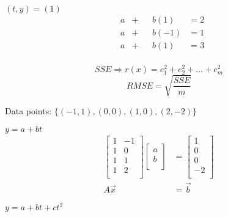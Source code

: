 \documentclass[
	date={October 9{,} 2024},
	month={10},
	day={9}
]{math486notes}
\begin{document}
\begin{example}
	$(t,y) = (1)$
	\begin{equation*}
	\begin{aligned}
		&a &+& &b(1) &= 2\\
		&a &+& &b(-1) &= 1\\
		&a &+& &b(1) &= 3\\
	\end{aligned}
	\end{equation*}
\end{example}

\begin{equation}
	SSE \Rightarrow r(x) = e_{1}^{2} + e_{2}^{2} + \dots + e_{m}^{2}
	\label{eq:sse}
\end{equation}
\begin{equation}
	RMSE = \sqrt{\frac{SSE}{m}}
	\label{eq:rmse}
\end{equation}

Data points: $\{ (-1, 1), (0, 0), (1, 0), (2, -2) \}$
\begin{example}
	$y = a + bt$
	\begin{equation*}
	\begin{aligned}
		\left[ \begin{array}{cc}
			1 & -1\\
			1 & 0\\
			1 & 1\\
			1 & 2\\
		\end{array} \right]\left[ \begin{array}{c}
			a\\
			b\\
		\end{array} \right] &= \left[ \begin{array}{c}
			1\\
			0\\
			0\\
			-2\\
		\end{array} \right]\\
		A\vec{x} &= \vec{b}
	\end{aligned}
	\end{equation*}
\end{example}

\begin{example}
	$y = a + bt + ct^{2}$

\end{example}
\end{document}
